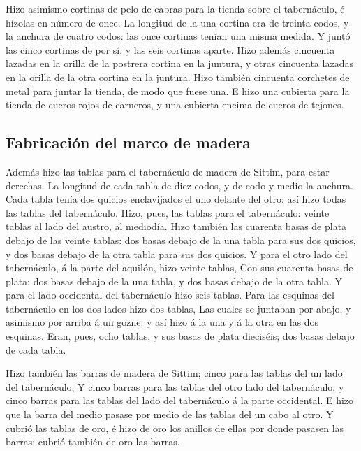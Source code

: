  Hizo asimismo cortinas de pelo de cabras para la tienda
sobre el tabernáculo, é hízolas en número de once.  La
longitud de la una cortina era de treinta codos, y la anchura de cuatro
codos: las once cortinas tenían una misma medida.  Y
juntó las cinco cortinas de por sí, y las seis cortinas aparte.
 Hizo además cincuenta lazadas en la orilla de la
postrera cortina en la juntura, y otras cincuenta lazadas en la orilla
de la otra cortina en la juntura.  Hizo también cincuenta
corchetes de metal para juntar la tienda, de modo que fuese una.
 E hizo una cubierta para la tienda de cueros rojos de
carneros, y una cubierta encima de cueros de tejones.

\hypertarget{fabricaciuxf3n-del-marco-de-madera}{%
\subsection{Fabricación del marco de
madera}\label{fabricaciuxf3n-del-marco-de-madera}}

 Además hizo las tablas para el tabernáculo de madera de
Sittim, para estar derechas.  La longitud de cada tabla
de diez codos, y de codo y medio la anchura.  Cada tabla
tenía dos quicios enclavijados el uno delante del otro: así hizo todas
las tablas del tabernáculo.  Hizo, pues, las tablas para
el tabernáculo: veinte tablas al lado del austro, al mediodía.
 Hizo también las cuarenta basas de plata debajo de las
veinte tablas: dos basas debajo de la una tabla para sus dos quicios, y
dos basas debajo de la otra tabla para sus dos quicios. 
Y para el otro lado del tabernáculo, á la parte del aquilón, hizo veinte
tablas,  Con sus cuarenta basas de plata: dos basas
debajo de la una tabla, y dos basas debajo de la otra tabla.
 Y para el lado occidental del tabernáculo hizo seis
tablas.  Para las esquinas del tabernáculo en los dos
lados hizo dos tablas,  Las cuales se juntaban por abajo,
y asimismo por arriba á un gozne: y así hizo á la una y á la otra en las
dos esquinas.  Eran, pues, ocho tablas, y sus basas de
plata dieciséis; dos basas debajo de cada tabla.

 Hizo también las barras de madera de Sittim; cinco para
las tablas del un lado del tabernáculo,  Y cinco barras
para las tablas del otro lado del tabernáculo, y cinco barras para las
tablas del lado del tabernáculo á la parte occidental.  E
hizo que la barra del medio pasase por medio de las tablas del un cabo
al otro.  Y cubrió las tablas de oro, é hizo de oro los
anillos de ellas por donde pasasen las barras: cubrió también de oro las
barras.

